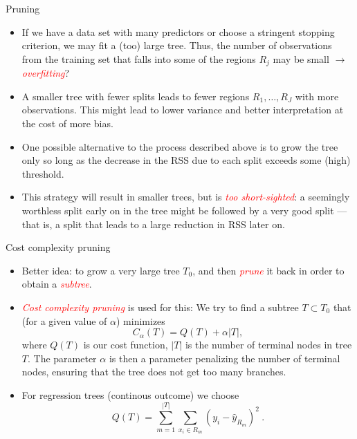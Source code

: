 \documentclass[10pt,ignorenonframetext,]{beamer}
\begin{document}
\begin{frame}{Pruning}

\begin{itemize}
\item
  If we have a data set with many predictors or choose a stringent
  stopping criterion, we may fit a (too) large tree. Thus, the number of
  observations from the training set that falls into some of the regions
  \(R_j\) may be small \(\rightarrow\)
  \emph{\textcolor{red}{overfitting}}?
\item
  A smaller tree with fewer splits leads to fewer regions
  \(R_1, \ldots, R_J\) with more observations. This might lead to lower
  variance and better interpretation at the cost of more bias.
\item
  One possible alternative to the process described above is to grow the
  tree only so long as the decrease in the RSS due to each split exceeds
  some (high) threshold.
\item
  This strategy will result in smaller trees, but is
  \emph{\textcolor{red}{too short-sighted}}: a seemingly worthless split
  early on in the tree might be followed by a very good split --- that
  is, a split that leads to a large reduction in RSS later on.
\end{itemize}

\end{frame}

\begin{frame}

\begin{block}{Cost complexity pruning}

\begin{itemize}
\item
  Better idea: to grow a very large tree \(T_0\), and then
  \emph{\textcolor{red}{prune}} it back in order to obtain a
  \emph{\textcolor{red}{subtree}}.
\item
  \emph{\textcolor{red}{Cost complexity pruning}} is used for this: We
  try to find a subtree \(T\subset T_0\) that (for a given value of
  \(\alpha\)) minimizes \[
  C_{\alpha}(T)=Q(T)+\alpha |T|,
  \] where \(Q(T)\) is our cost function, \(|T|\) is the number of
  terminal nodes in tree \(T\). The parameter \(\alpha\) is then a
  parameter penalizing the number of terminal nodes, ensuring that the
  tree does not get too many branches.
\item
  For regression trees (continous outcome) we choose
  \[Q(T)=\sum_{m=1}^{|T|}\sum_{x_i\in R_m}(y_i - \hat{y}_{R_m})^2 \ .\]
\end{itemize}

\end{block}

\end{frame}
\end{document}
